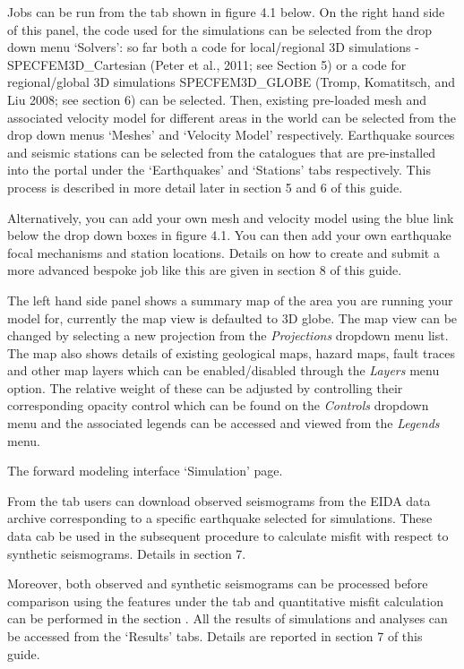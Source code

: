 \documentclass[english]{book}
\begin{document}
Jobs can be run from the  tab shown in figure 4.1 below.
On the right hand side of this panel, the code used for the simulations
can be selected from the drop down menu ‘Solvers’: so far both a code
for local/regional 3D simulations - SPECFEM3D\_Cartesian (Peter et al.,
2011; see Section 5) \textendash{} or a code for regional/global 3D simulations \textendash{}
SPECFEM3D\_GLOBE (Tromp, Komatitsch, and Liu 2008; see section 6) \textendash{} can
be selected. Then, existing pre-loaded mesh and associated velocity
model for different areas in the world can be selected from the drop
down menus ‘Meshes’ and ‘Velocity Model’ respectively. Earthquake
sources and seismic stations can be selected from the catalogues that
are pre-installed into the portal under the ‘Earthquakes’ and ‘Stations’
tabs respectively. This process is described in more detail later in
section 5 and 6 of this guide.

Alternatively, you can add your own mesh and velocity model using the
blue link below the drop down boxes in figure 4.1. You can then add your
own earthquake focal mechanisms and station locations. Details on how to
create and submit a more advanced bespoke job like this are given in
section 8 of this guide.

The left hand side panel shows a summary map of the area you are running your model for, currently the map view is defaulted to 3D globe. The map view can be changed by selecting a new projection from the \emph{Projections} dropdown menu list. The map also shows details of existing geological maps, hazard maps, fault traces and other map layers which can be enabled/disabled through the \emph{Layers} menu option. The relative weight of these can be adjusted by controlling their corresponding opacity control which can be found on the \emph{Controls} dropdown menu and the associated legends can be accessed and viewed from the \emph{Legends} menu.


 The forward modeling interface ‘Simulation’ page.

From the  tab users can download observed seismograms from
the EIDA data archive corresponding to a specific earthquake selected
for simulations. These data cab be used in the subsequent procedure to
calculate misfit with respect to synthetic seismograms. Details in
section 7.

Moreover, both observed and synthetic seismograms can be processed
before comparison using the features under the  tab and
quantitative misfit calculation can be performed in the section
. All the results of simulations and analyses can be accessed
from the ‘Results’ tabs. Details are reported in section 7 of this
guide.
\end{document}
